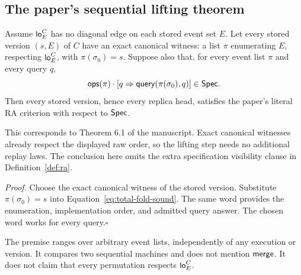 \subsection{The paper's sequential lifting theorem}

\begin{theorem}
\label{thm:sequential-lift}
Assume $\mathsf{lo}^{C}_{E}$ has no diagonal edge on each stored event set $E$.
Let every stored
version $(s,E)$ of $C$ have an exact canonical witness: a list $\pi$ enumerating
$E$, respecting $\mathsf{lo}^{C}_{E}$, with $\pi(\sigma_0)=s$.
Suppose also that, for every event list $\pi$ and every query $q$,
\begin{equation}
 \mathsf{ops}(\pi)\cdot
 [q\Rightarrow\mathsf{query}(\pi(\sigma_0),q)]\in\mathsf{Spec}.
 \label{eq:total-fold-sound}
\end{equation}
Then every stored version, hence every replica head, satisfies the paper's
literal RA criterion with respect to $\mathsf{Spec}$.
\end{theorem}
This corresponds to Theorem 6.1 of the manuscript. Exact canonical witnesses
already respect the displayed raw order, so the lifting step needs no additional
replay laws. The conclusion here omits the extra specification visibility
clause in Definition~\ref{def:ra}.

\noindent\emph{Proof.}
Choose the exact canonical witness of the stored version. Substitute
$\pi(\sigma_0)=s$ into Equation~\eqref{eq:total-fold-sound}. The same word
provides the enumeration, implementation order, and admitted query answer.
The chosen word works for every query.\hfill$\square$

The premise ranges over arbitrary event lists, independently of any execution
or version. It compares two sequential machines and does not mention
$\mathsf{merge}$. It does not claim that every permutation respects
$\mathsf{lo}^{C}_{E}$.

